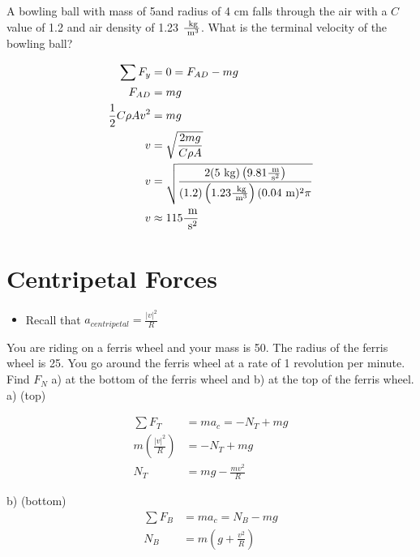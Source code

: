 \begin{problem}
	A bowling ball with mass of 5\kg \text{ }and radius of 4 cm falls through the air with a $C$ value of 1.2 and air density of 1.23 $\frac{\text{ kg}}{\text{ m}^3}$. What is the terminal velocity of the bowling ball?

	$$
	\begin{aligned}
		\sum F_y &= 0 = F_{AD} - mg\\
		F_{AD} &= mg\\
		\frac{1}{2}C\rho Av^2 &= mg\\
		v &= \sqrt{\frac{2mg}{C\rho A}}\\
		v &= \sqrt{\frac{2(5\text{ kg})\left(9.81\frac{\text{ m}}{\text{ s}^2}\right)}{(1.2)\left(1.23 \frac{\text{ kg}}{\text{ m}^3}\right)(0.04\text{ m})^2\pi}}\\
		v &\approx 115 \frac{\text{ m}}{\text{ s}^2}
	\end{aligned}
	$$
\end{problem}


\section{Centripetal Forces}

\begin{itemize}
	\item Recall that $a_{centripetal} = \frac{|v|^2}{R}$
\end{itemize}


\begin{problem}
	You are riding on a ferris wheel and your mass is 50\kg. The radius of the ferris wheel is 25\m. You go around the ferris wheel at a rate of 1 revolution per minute. Find $F_N$ a) at the bottom of the ferris wheel and b) at the top of the ferris wheel.\\

	a) (top)

	$$
	\begin{aligned}
		\sum F_{T} &= ma_c = -N_{T} + mg\\
		m\left(\frac{|v|^2}{R}\right) &= -N_{T} + mg\\
		N_{T} &= mg - \frac{mv^2}{R}
	\end{aligned}
	$$

	b) (bottom)
	$$
	\begin{aligned}
		\sum F_{B} &= ma_c = N_B - mg\\
		N_B &= m\left(g + \frac{v^2}{R}\right)
	\end{aligned}
	$$
\end{problem}



